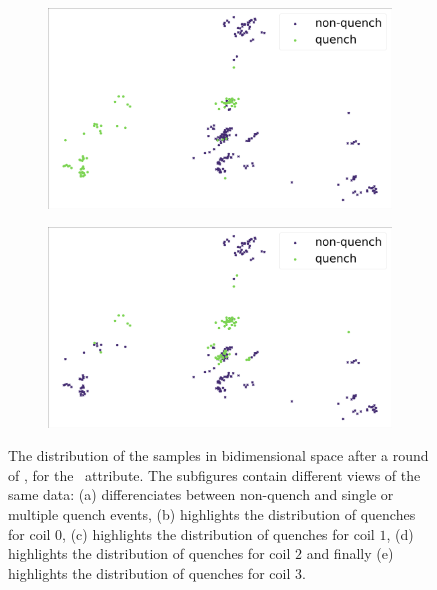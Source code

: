 \begin{figure}[!h]
\begin{subfigure}{0.49\linewidth}
		\subcaption{}
	\end{subfigure}
	\begin{subfigure}{0.49\linewidth}
		\includegraphics[width=\linewidth]{img/quench_dist_qlp/quenches_coil_2_An.png}
		\subcaption{}
	\end{subfigure}
	\begin{subfigure}{0.49\linewidth}
		\includegraphics[width=\linewidth]{img/quench_dist_qlp/quenches_coil_3_An.png}
		\subcaption{}
	\end{subfigure}
	\caption{The distribution of the samples in bidimensional space after a round of \pca, for
		the \an\ attribute. The subfigures contain different views of the same data: (a) differenciates between non-quench and single or multiple quench events, (b) highlights the distribution of quenches for coil $0$, (c) highlights the distribution of quenches for coil $1$, (d) highlights the distribution of quenches for coil $2$ and finally (e) highlights the distribution of quenches for coil $3$.}
	\label{fig:an-coilq-dist}
\end{figure}

